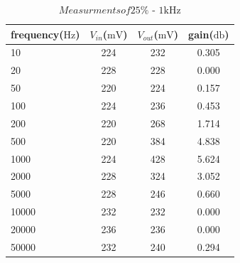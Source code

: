 \begin{table}[!htbp]
	\centering
	\caption{$Measurments of 25\%$ - $1\si{\kilo\hertz}$}
	\label{tab:data01}
	\begin{tabular}{lccc}
		\toprule
		frequency($\si{\hertz}$) & $V_{in}$($\si{\milli\volt}$) & $V_{out}$($\si{\milli\volt}$) & gain($\si{\decibel}$) \\
		\midrule
		10&	224&	232&	0.305\\
		20&	228&	228&	0.000\\
		50&	220&	224&	0.157\\
		100&	224&	236&	0.453\\
		200&	220&	268&	1.714\\
		500&	220&	384&	4.838\\
		1000&	224&	428&	5.624\\
		2000&	228&	324&	3.052\\
		5000&	228&	246&	0.660\\
		10000&	232&	232&	0.000\\
		20000&	236&	236&	0.000\\
		50000&	232&	240&	0.294\\
		\bottomrule
	\end{tabular}
\end{table}